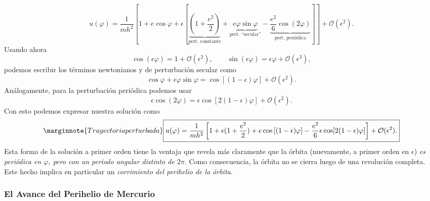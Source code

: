 \begin{equation}\label{solucasi}
 u(\varphi)=\frac{1}{mh^2}\left[1+e\cos\varphi+\epsilon\left[\underbrace{
(1+\frac { e^2 } { 2 } )}_\text{pert.
constante}+\underbrace{e\varphi\sin\varphi}_\text{pert. ``secular''}
-\underbrace{\frac{e^2 }{6} \cos(2\varphi)}_\text{pert. periódica}\right ]
\right ] +\mathcal{O}(\epsilon^2).
\end{equation}
Usando ahora
\begin{equation}
 \cos(\epsilon\varphi) =1+\mathcal{O}(\epsilon^2), \qquad
\sin(\epsilon\varphi) =\epsilon\varphi+\mathcal{O}(\epsilon^3),
\end{equation}
podemos escribir los términos newtonianos y de perturbación secular como
\begin{equation}
 \cos\varphi+\epsilon\varphi\sin\varphi=\cos\left[(1-\epsilon)\varphi\right]
+\mathcal{O}(\epsilon^2).
\end{equation}
Análogamente, para la perturbación periódica podemos usar
\begin{equation}
 \epsilon\cos(2\varphi)=\epsilon\cos\left[2(1-\epsilon)\varphi\right]+\mathcal{O}(\epsilon^2).
\end{equation}
Con esto podemos expresar nuestra solución como
\begin{equation}\marginnote{Trayectoria perturbada}
 \boxed{u(\varphi)=\frac{1}{mh^2}\left[1+\epsilon(1+\frac { e^2 } { 2 }
)+e\cos\left[(1-\epsilon)\varphi\right] -\frac { e^2
}{6}\epsilon\cos[2(1-\epsilon)\varphi]\right ] +\mathcal{O}(\epsilon^2).} \label{solu1}
\end{equation}
Esta forma de la solución a primer orden tiene la ventaja que revela más claramente que la órbita (nuevamente, a primer orden en $\epsilon$) \textit{es periódica en $\varphi$, pero con un periodo angular distinto de $2\pi$}. Como consecuencia, la órbita no se cierra luego de una revolución completa. Este hecho implica en particular un \textit{corrimiento del perihelio de la órbita}.

\subsubsection{El Avance del Perihelio de Mercurio}

